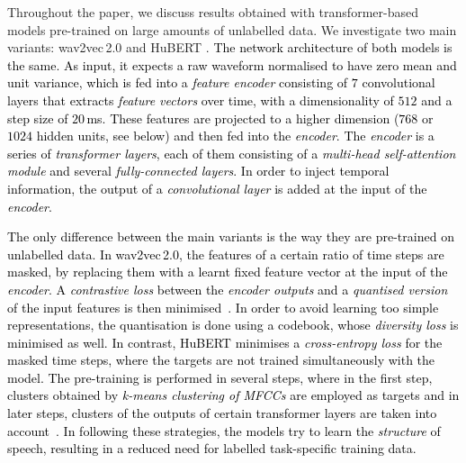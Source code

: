 \documentclass{article}
\newcommand{\review}[1]{\textcolor{black}{#1}}
\newcommand{\wtov}{wav2vec\,2.0}
\newcommand{\hubert}{HuBERT}
\begin{document}
Throughout the paper,
we discuss results obtained with transformer-based models
pre-trained on large amounts of unlabelled data. 
We investigate two main variants: {\wtov} \cite{baevski2020wav2vec} and {\hubert} \cite{hsu2021hubert}.
\review{The network architecture of both models is the same. As input, it expects a raw waveform 
normalised to have zero mean and unit variance, which is fed into a \emph{feature encoder} consisting of $7$ convolutional layers that extracts \emph{feature vectors} over time, with a dimensionality of $512$ and a step size of $20$\,ms. These features are projected to a higher dimension ($768$ or $1024$ hidden units, see below) and then fed into the \emph{encoder}. The \emph{encoder} is a series of \emph{transformer layers}, each of them consisting of a \emph{multi-head self-attention module} and several \emph{fully-connected layers}. In order to inject temporal information, the output of a \emph{convolutional layer} is added at the input of the \emph{encoder}.}

\review{The only difference between the main variants is the way they are pre-trained on unlabelled data.
In {\wtov}, the features of a certain ratio of time steps are masked, by replacing them with a learnt fixed feature vector at the input of the \emph{encoder}. A \emph{contrastive loss} between the \emph{encoder outputs} and a \emph{quantised version} of the input features is then minimised~\cite{baevski2020wav2vec}. In order to avoid learning too simple representations, the quantisation is done using a codebook, whose \emph{diversity loss} is minimised as well.}
\review{In contrast, {\hubert} minimises a \emph{cross-entropy loss} for the masked time steps, where the targets are not trained simultaneously with the model.
The pre-training is performed in several steps, where in the first step, clusters obtained by \emph{k-means clustering of MFCCs} are employed as targets and in later steps, clusters of the outputs of certain transformer layers are taken into account~\cite{hsu2021hubert}.
In following these strategies, the models try to learn the \emph{structure} of speech, resulting in a reduced need for labelled task-specific training data.}
\end{document}
